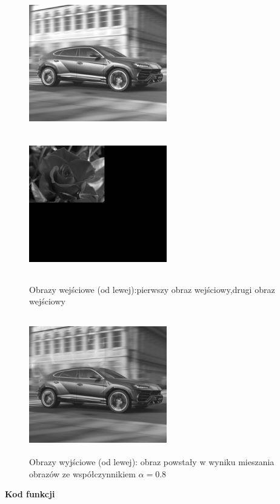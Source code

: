 \documentclass[magisterska,openany]{pracadypl}
\begin{document}
\newpage
\begin{figure}[h]
\centering
\includegraphics[width=6cm, height=6cm]{2_2/ResolG3.jpg}
\includegraphics[width=6cm, height=6cm]{2_2/ResolG4.jpg}
\caption{Obrazy wejściowe (od lewej):pierwszy obraz wejściowy,drugi obraz wejściowy}
\end{figure}
\begin{figure}[h]
\centering
\includegraphics[width=6cm, height=6cm]{3_5/mixG2.jpg}
\caption{Obrazy wyjściowe (od lewej): obraz powstały w wyniku
mieszania obrazów ze współczynnikiem $\alpha=0.8$}
\end{figure}

\newpage
\textbf{\Large Kod funkcji}
   
\end{document}
